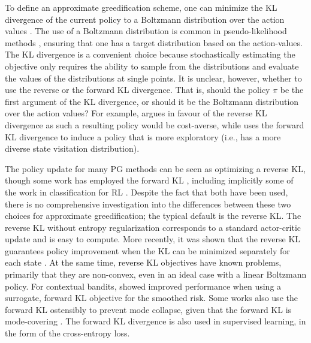 \documentclass[\main/thesis.tex]{subfiles}
\begin{document}
To define an approximate greedification scheme, one can minimize the KL divergence of the current policy to a Boltzmann distribution over the action values \citep{wagner2011reinterpretation}. The use of a Boltzmann distribution is common in pseudo-likelihood methods \citep{kober2009policy,neumann2011variational,levine2018reinforcement}, ensuring that one has a target distribution based on the action-values. The KL divergence is a convenient choice because stochastically estimating the objective only requires the ability to sample from the distributions and evaluate the values of the distributions at single points. It is unclear, however, whether to use the reverse or the forward KL divergence. That is, should the policy $\pi$ be the first argument of the KL divergence, or should it be the Boltzmann distribution over the action values? For example, \citet{neumann2011variational} argues in favour of the reverse KL divergence as such a resulting policy would be cost-averse, while \citet{norouzi2016reward} uses the forward KL divergence to induce a policy that is more exploratory (i.e., has a more diverse state visitation distribution). 

The policy update for many PG methods can be seen as optimizing a reverse KL, though some work has employed the forward KL \citep{norouzi2016reward,nachum2016improving,agarwal2019learning,vieillard2019deep}, including implicitly some of the work in classification for RL \citep{lagoudakis2003reinforcement,lazaric2010analysis,farahmand2015classificationbased}. Despite the fact that both have been used, there is no comprehensive investigation into the differences between these two choices for approximate greedification; the typical default is the reverse KL. The reverse KL without entropy regularization corresponds to a standard actor-critic update and is easy to compute. More recently, it was shown that the reverse KL guarantees policy improvement when the KL can be minimized separately for each state \citep[p.~4]{haarnoja2018soft}. At the same time, reverse KL objectives have known problems, primarily that they are non-convex, even in an ideal case with a linear Boltzmann policy. For contextual bandits, \citet{chen2019surrogate} showed improved performance when using a surrogate, forward KL objective for the smoothed risk. Some works also use the forward KL ostensibly to prevent mode collapse, given that the forward KL is mode-covering \citep{agarwal2019learning,mei2019principled}. The forward KL divergence is also used in supervised learning, in the form of the cross-entropy loss. 
 
\end{document}
